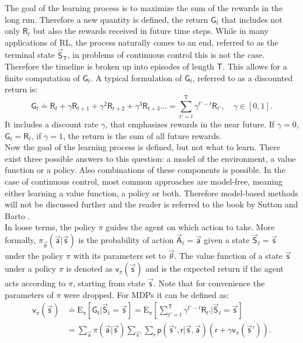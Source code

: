 The goal of the learning process is to maximize the sum of the rewards in the long run. Therefore a new quantity is defined, the return $\mathsf{G}_t$ that includes not only $\mathsf{R}_t$ but also the rewards received in future time steps. While in many applications of RL, the process naturally comes to an end, referred to as the terminal state $\vec{\mathsf{S}}_\mathsf{T}$, in problems of continuous control this is not the case. Therefore the timeline is broken up into episodes of length $\mathsf{T}$. This allows for a finite computation of $\mathsf{G}_t$. A typical formulation of $\mathsf{G}_t$, referred to as a discounted return is:
\begin{equation}
\mathsf{G}_t \doteq \mathsf{R}_t + \gamma \mathsf{R}_{t+1} + \gamma^2 \mathsf{R}_{t+2} + \gamma^3 \mathsf{R}_{t+3}... = \sum_{t'=t}^{\mathsf{T}}\gamma^{t'-t} \mathsf{R}_{t'},\quad \gamma \in [0, 1]. \label{eq:return}
\end{equation}
It includes a discount rate $\gamma$, that emphasizes rewards in the near future. If $\gamma = 0$, $\mathsf{G}_t = \mathsf{R}_t$, if $\gamma = 1$, the return is the sum of all future rewards. \cite[p. 47- 57]{sutton_reinforcement_2018} \\
Now the goal of the learning process is defined, but not what to learn. There exist three possible answers to this question: a model of the environment, a value function or a policy. Also combinations of these components is possible. In the case of continuous control, most common approaches are model-free, meaning either learning a value function, a policy or both. Therefore model-based methods will not be discussed further and the reader is referred to the book by Sutton and Barto \cite{sutton_reinforcement_2018}. \\
In loose terms, the policy $\pi$ guides the agent on which action to take. More formally, $\pi_{\vec{\theta}}(\vec{\mathsf{a}}|\vec{\mathsf{s}})$ is the probability of action $\vec{\mathsf{A}}_t=\vec{\mathsf{a}}$ given a state $\vec{\mathsf{S}}_t=\vec{\mathsf{s}}$ under the policy $\pi$ with its parameters set to $\vec{\theta}$. The value function of a state $\vec{\mathsf{s}}$ under a policy $\pi$ is denoted as $\mathsf{v}_{\pi}(\vec{\mathsf{s}})$ and is the expected return if the agent acts according to $\pi$, starting from state $\vec{\mathsf{s}}$. Note that for convenience the parameters of $\pi$ were dropped. For MDPs it can be defined as:
\begin{align}
	\mathsf{v}_{\pi}(\vec{\mathsf{s}}) &\doteq \mathrm{E}_\pi \left[ \mathsf{G}_t \vert \vec{\mathsf{S}}_t= \vec{\mathsf{s}} \right] =
	\mathrm{E}_\pi \left[\sum_{t'=t}^{\mathsf{T}}\gamma^{t'-t} \mathsf{R}_{t'} \vert \vec{\mathsf{S}}_t=\vec{\mathsf{s}}\right] \label{eq:value_func} \\
	&= \sum_{\vec{\mathsf{a}}} \pi(\vec{\mathsf{a}} \vert \vec{\mathsf{s}})
	\sum_{\vec{\mathsf{s}}'} \sum_{\mathsf{r}} \mathsf{p}(\vec{\mathsf{s}}',\mathsf{r} \vert \vec{\mathsf{s}},\vec{\mathsf{a}}) \left( \mathsf{r} + \gamma \mathsf{v}_\pi(\vec{\mathsf{s}}') \right). \label{eq:Bellmann}
\end{align}
